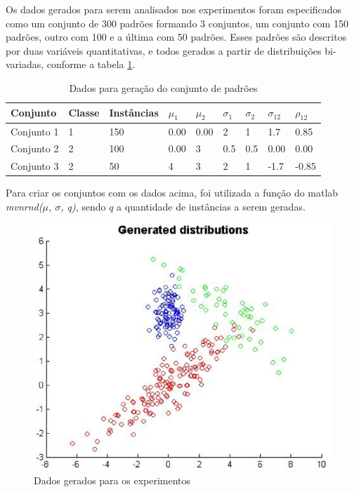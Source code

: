 
Os dados gerados para serem analisados nos experimentos foram especificados como um conjunto de 300 padrões formando 3 conjuntos, um conjunto com 150 padrões, outro com 100 e a última com 50 padrões. Esses padrões são descritos por duas variáveis quantitativas, e todos gerados a partir de distribuições bi-variadas, conforme a tabela \ref{tab:dados}.

\begin{table}[H]
\begin{center}
\begin{tabular}{|l|l|l|l|l|l|l|l|l|}
\hline
Conjunto 				& 	Classe	&	Instâncias	&	$\mu_1$	&	$\mu_2$	&	$\sigma_1$	&	$\sigma_2$	&	$\sigma_{12}$	&	$\rho_{12}$	\\
\hline %
Conjunto 1           	&	1		&  		150		&	0.00   	&   0.00    &   	2   	&		1   	&		1.7		&		0.85	\\
Conjunto 2     			&   2		&   	100		&	0.00	&   3		&   	0.5		&   	0.5   	&		0.00	&		0.00	\\
Conjunto 3     			&   2		&   	50		&	4		&   3		&   	2		&   	1   	&		-1.7	&		-0.85	\\
\hline
\end{tabular}%
\end{center}   %
\caption{Dados para geração do conjunto de padrões}
\label{tab:dados}
\end{table}

Para criar os conjuntos com os dados acima, foi utilizada a função do matlab \textit{mvnrnd($\mu$, $\sigma$, q)}, sendo $q$ a quantidade de instâncias a serem geradas.

\begin{figure}[H]
\center
\includegraphics[scale=0.60]{imagens/tecnicas/generatedDistributions.eps}
\caption{Dados gerados para os experimentos}
\label{fig:dados}
\end{figure}


